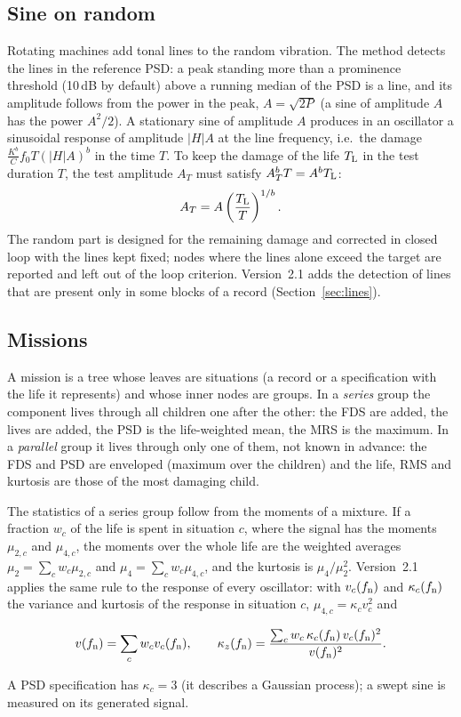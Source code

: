 \subsection{Sine on random}\label{sec:sor2}

Rotating machines add tonal lines to the random vibration. The method  detects the lines
in the reference PSD: a peak standing more than a prominence threshold (10\,dB by default) above a
running median of the PSD is a line, and its amplitude follows from the power in the peak,
$A = \sqrt{2P}$ (a sine of amplitude $A$ has the power $A^2/2$). A stationary sine of amplitude $A$
produces in an oscillator a sinusoidal response of amplitude $|H|A$ at the line frequency, i.e.\
the damage $\frac{K^b}{C}f_0 T(|H|A)^b$ in the time $T$. To keep the damage of the life $T_{\mathrm{L}}$ in the
test duration $T$, the test amplitude $A_T$ must satisfy $A_T^bT = A^bT_{\mathrm{L}}$:
\begin{equation}\label{eq:sorgain}
  A_T = A\left(\frac{T_{\mathrm{L}}}{T}\right)^{1/b}.
\end{equation}
The random part is designed for the remaining damage and corrected in closed loop with the lines kept
fixed; nodes where the lines alone exceed the target are reported and left out of the loop criterion.
Version~2.1 adds the detection of lines that are present only in some blocks of a record
(Section~\ref{sec:lines}).

\subsection{Missions}\label{sec:missions}

A mission is a tree whose leaves are situations (a record or a specification with the life it
represents) and whose inner nodes are groups. In a \emph{series} group the component lives through
all children one after the other: the FDS are added, the lives are added, the PSD is the
life-weighted mean, the MRS is the maximum. In a \emph{parallel} group it lives through only one of
them, not known in advance: the FDS and PSD are enveloped (maximum over the children) and the life,
RMS and kurtosis are those of the most damaging child.

The statistics of a series group follow from the moments of a mixture. If a fraction $w_c$ of the
life is spent in situation $c$, where the signal has the moments $\mu_{2,c}$ and $\mu_{4,c}$, the
moments over the whole life are the weighted averages $\mu_2 = \sum_cw_c\mu_{2,c}$ and $\mu_4 =
\sum_cw_c\mu_{4,c}$, and the kurtosis is $\mu_4/\mu_2^2$. Version~2.1 applies the same rule to the
response of every oscillator: with $v_c(f_{\mathrm{n}})$ and $\kappa_c(f_{\mathrm{n}})$ the variance and kurtosis of the
response in situation $c$, $\mu_{4,c} = \kappa_cv_c^2$ and
\begin{result}
\begin{equation}\label{eq:kzmix}
  v(f_{\mathrm{n}}) = \sum_c w_c v_c(f_{\mathrm{n}}),\qquad
  \kappa_z(f_{\mathrm{n}}) = \frac{\sum_c w_c\,\kappa_c(f_{\mathrm{n}})\,v_c(f_{\mathrm{n}})^2}{v(f_{\mathrm{n}})^2}.
\end{equation}
\end{result}
A PSD specification has $\kappa_c = 3$ (it describes a Gaussian process); a swept sine is measured on
its generated signal.
